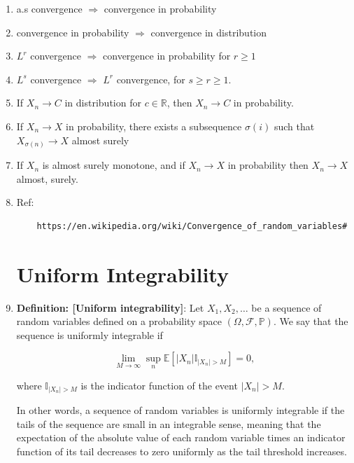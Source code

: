 \documentclass[12pt,oneside]{book}
\begin{document}
\begin{enumerate}
\item a.s convergence $\Rightarrow$ convergence in probability
\item convergence in probability $\Rightarrow$ convergence in distribution
\item $L^r$ convergence $\Rightarrow$ convergence in probability for $r\geq 1$
\item $L^s$ convergence $\Rightarrow$ $L^r$ convergence, for $s\geq r\geq 1$. 
\item If $X_n\to C$ in distribution for $c\in\mathbb R$, then $X_n\to C$ in probability.
\item If $X_n\to X$ in probability, there exists a subsequence $\sigma(i)$ such that $X_{\sigma(n)}\to X$ almost surely
\item If $X_n$ is almost surely monotone, and if $X_n\to X$ in probability then $X_n\to X$ almost, surely. 
\item Ref: 
\begin{verbatim}
    https://en.wikipedia.org/wiki/Convergence_of_random_variables#
\end{verbatim}
\section{Uniform Integrability}

\item \textbf{Definition: [Uniform integrability]}: Let $X_1, X_2, \ldots$ be a sequence of random variables defined on a probability space $(\Omega, \mathcal{F}, \mathbb{P})$. We say that the sequence is uniformly integrable if

\begin{equation*}
\lim_{M \rightarrow \infty} \sup_{n} \mathbb{E}[|X_n| \mathbb{I}_{{|X_n| > M}}] = 0,
\end{equation*}

where $\mathbb{I}_{{|X_n| > M}}$ is the indicator function of the event ${|X_n| > M}$.

In other words, a sequence of random variables is uniformly integrable if the tails of the sequence are small in an integrable sense, meaning that the expectation of the absolute value of each random variable times an indicator function of its tail decreases to zero uniformly as the tail threshold increases.


\end{enumerate}
\end{document}
